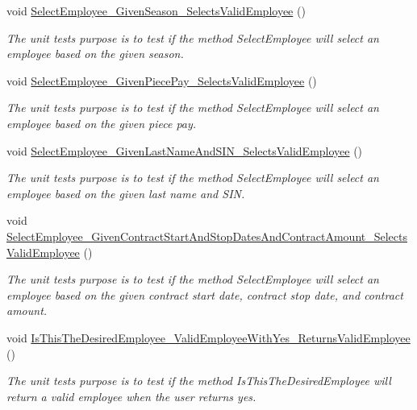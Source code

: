 \begin{DoxyCompactItemize}
void \hyperlink{class_the_company_1_1_tests_1_1_select_employee_tests_a49aa7f771fba78a5deccefe9c8f441c5}{Select\+Employee\+\_\+\+Given\+Season\+\_\+\+Selects\+Valid\+Employee} ()
\begin{DoxyCompactList}\small\item\em The unit test\textquotesingle{}s purpose is to test if the method Select\+Employee will select an employee based on the given season. \end{DoxyCompactList}\item 
void \hyperlink{class_the_company_1_1_tests_1_1_select_employee_tests_a26ebfea9f96e8491fdcf2ae26e58ffaf}{Select\+Employee\+\_\+\+Given\+Piece\+Pay\+\_\+\+Selects\+Valid\+Employee} ()
\begin{DoxyCompactList}\small\item\em The unit test\textquotesingle{}s purpose is to test if the method Select\+Employee will select an employee based on the given piece pay. \end{DoxyCompactList}\item 
void \hyperlink{class_the_company_1_1_tests_1_1_select_employee_tests_a2c1e3fb8fa72796ca0080da5affcfda5}{Select\+Employee\+\_\+\+Given\+Last\+Name\+And\+S\+I\+N\+\_\+\+Selects\+Valid\+Employee} ()
\begin{DoxyCompactList}\small\item\em The unit test\textquotesingle{}s purpose is to test if the method Select\+Employee will select an employee based on the given last name and S\+I\+N. \end{DoxyCompactList}\item 
void \hyperlink{class_the_company_1_1_tests_1_1_select_employee_tests_a5e23da7211dd6b862bf074f5f9ceba83}{Select\+Employee\+\_\+\+Given\+Contract\+Start\+And\+Stop\+Dates\+And\+Contract\+Amount\+\_\+\+Selects\+Valid\+Employee} ()
\begin{DoxyCompactList}\small\item\em The unit test\textquotesingle{}s purpose is to test if the method Select\+Employee will select an employee based on the given contract start date, contract stop date, and contract amount. \end{DoxyCompactList}\item 
void \hyperlink{class_the_company_1_1_tests_1_1_select_employee_tests_adf576e1cffc084ddd92526fe93e8e391}{Is\+This\+The\+Desired\+Employee\+\_\+\+Valid\+Employee\+With\+Yes\+\_\+\+Returns\+Valid\+Employee} ()
\begin{DoxyCompactList}\small\item\em The unit test\textquotesingle{}s purpose is to test if the method Is\+This\+The\+Desired\+Employee will return a valid employee when the user returns yes. \end{DoxyCompactList}\item 

\end{DoxyCompactItemize}
